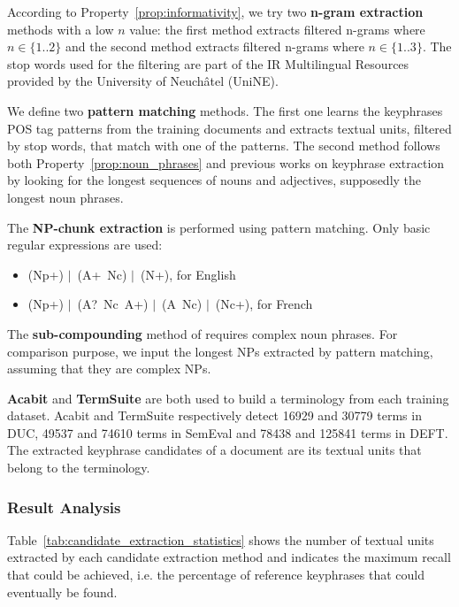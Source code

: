       According to Property~\ref{prop:informativity}, we try two \textbf{n-gram
      extraction} methods with a low $n$ value: the first method extracts
      filtered n-grams where $n \in \{1..2\}$ and the second method extracts
      filtered n-grams where $n \in \{1..3\}$. The stop words used for the
      filtering are part of the IR Multilingual Resources provided by the
      University of Neuchâtel (UniNE).

      We define two \textbf{pattern matching} methods. The first one learns the
      keyphrases POS tag patterns from the training documents and extracts
      textual units, filtered by stop words, that match with one of the
      patterns. The second method follows both Property~\ref{prop:noun_phrases}
      and previous works on keyphrase extraction by looking for the longest
      sequences of nouns and adjectives, supposedly the longest noun phrases.

      The \textbf{NP-chunk extraction} is performed using pattern matching. Only
      basic regular expressions are used:
      \begin{itemize}
        \item{(Np+) $|$~(A+~Nc) $|$~(N+), for English}
        \item{(Np+) $|$~(A?~Nc~A+) $|$~(A~Nc) $|$~(Nc+),
              for French}
      \end{itemize}

      The \textbf{sub-compounding} method of
       requires complex noun phrases. For
      comparison purpose, we input the longest NPs extracted by pattern
      matching, assuming that they are complex NPs.

      \textbf{Acabit} and \textbf{TermSuite} are both used to build a
      terminology from each training dataset. Acabit and TermSuite respectively
      detect 16929 and 30779 terms in DUC, 49537 and 74610 terms in SemEval and
      78438 and 125841 terms in DEFT. The extracted keyphrase candidates of a
      document are its textual units that belong to the terminology.

    \subsubsection{Result Analysis}
    \label{subsubsec:candidate_extraction_result_analysis}
      Table~\ref{tab:candidate_extraction_statistics} shows the number of
      textual units extracted by each candidate extraction method and indicates
      the maximum recall that could be achieved, i.e. the percentage of
      reference keyphrases that could eventually be found.


